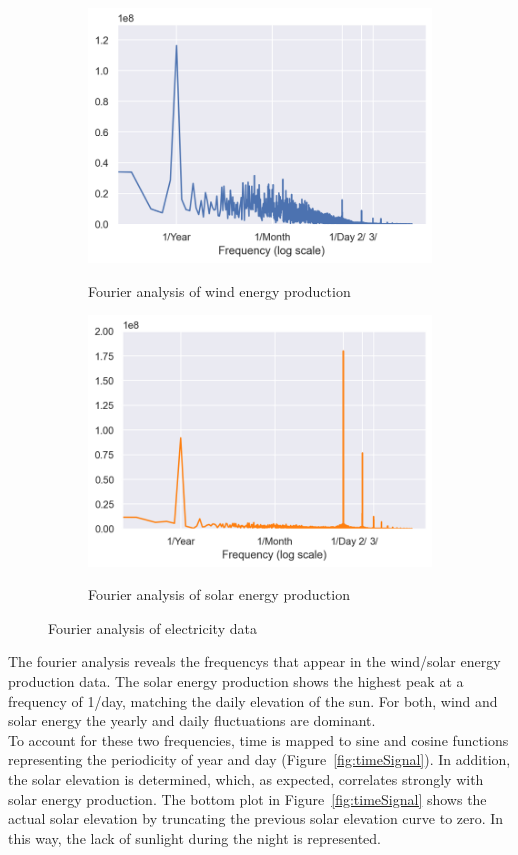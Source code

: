 \documentclass[11pt,table]{article}
\begin{document}
\begin{figure}[H]
\centering
\begin{subfigure}{.5\textwidth}
  \centering
  \includegraphics[width=0.9\linewidth]{Figures/fourierWind.png}
  \label{fig:fourierWind}
  \caption{Fourier analysis of wind energy production}
\end{subfigure}%
\begin{subfigure}{.5\textwidth}
  \centering
  \includegraphics[width=0.9\linewidth]{Figures/fourierSolar.png}
  \label{fig:fourierSolar}
  \caption{Fourier analysis of solar energy production}
\end{subfigure}
\caption{Fourier analysis of electricity data}
\label{fig:fourier}
\end{figure}

The fourier analysis reveals the frequencys that appear in the wind/solar energy production data. The solar energy production shows the highest peak at a frequency of 1/day, matching the daily elevation of the sun. For both, wind and solar energy the yearly and daily fluctuations are dominant.\\
To account for these two frequencies, time is mapped to sine and cosine functions representing the periodicity of year and day (Figure~\ref{fig:timeSignal}). In addition, the solar elevation is determined, which, as expected, correlates strongly with solar energy production. The bottom plot in Figure~\ref{fig:timeSignal} shows the actual solar elevation by truncating the previous solar elevation curve to zero. In this way, the lack of sunlight during the night is represented.
\end{document}
